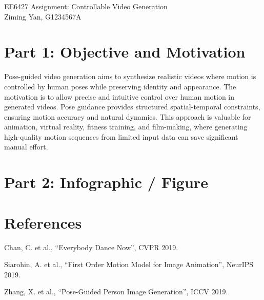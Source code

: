 \documentclass[a4paper,12pt]{article}
\begin{document}
\begin{center}
    {\LARGE EE6427 Assignment: Controllable Video Generation} \\[0.5cm]
    {\Large Ziming Yan, G1234567A} %
\end{center}
\vspace{0.5cm}

\section*{Part 1: Objective and Motivation}

\noindent
Pose-guided video generation aims to synthesize realistic videos where motion is controlled by human poses while preserving identity and appearance. The motivation is to allow precise and intuitive control over human motion in generated videos. Pose guidance provides structured spatial-temporal constraints, ensuring motion accuracy and natural dynamics. This approach is valuable for animation, virtual reality, fitness training, and film-making, where generating high-quality motion sequences from limited input data can save significant manual effort.

\section*{Part 2: Infographic / Figure}


\section*{References}
\begin{enumerate}[label={[\arabic*]}]
    \item Chan, C. et al., ``Everybody Dance Now'', CVPR 2019.
    \item Siarohin, A. et al., ``First Order Motion Model for Image Animation'', NeurIPS 2019.
    \item Zhang, X. et al., ``Pose-Guided Person Image Generation'', ICCV 2019.
\end{enumerate}
\end{document}
